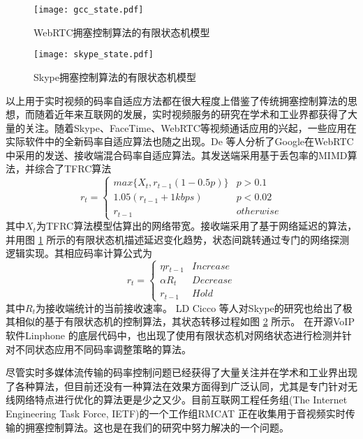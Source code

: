 \begin{figure}[htbp]
  \centering
  \texttt{[image: gcc\_state.pdf]}
  \caption{WebRTC拥塞控制算法的有限状态机模型}
  \label{fig:gcc_state}
\end{figure}

\begin{figure}[htbp]
  \centering
  \texttt{[image: skype\_state.pdf]}
  \caption{Skype拥塞控制算法的有限状态机模型}
  \label{fig:skype_state}
\end{figure}

以上用于实时视频的码率自适应方法都在很大程度上借鉴了传统拥塞控制算法的思想，而随着近年来互联网的发展，实时视频服务的研究在学术和工业界都获得了大量的关注。随着Skype、FaceTime、WebRTC等视频通话应用的兴起，一些应用在实际软件中的全新码率自适应算法也随之出现。De \cite{de2013experimental} 等人分析了Google在WebRTC中采用的发送、接收端混合码率自适应算法。其发送端采用基于丢包率的MIMD算法，并综合了TFRC算法
\begin{equation}
  r_t = \left\{ \begin{array}{ll}
    max\{X_t, r_{t-1}(1-0.5p)\} &   p > 0.1\\
    1.05(r_{t-1} + 1kbps)       &   p < 0.02\\
    r_{t-1}                     &   otherwise
  \end{array} \right.
\end{equation}
其中$X_t$为TFRC算法模型估算出的网络带宽。接收端采用了基于网络延迟的算法，并用图 \ref{fig:gcc_state} 所示的有限状态机描述延迟变化趋势，状态间跳转通过专门的网络探测逻辑实现。其相应码率计算公式为
\begin{equation}
  r_t = \left\{ \begin{array}{ll}
    \eta r_{t-1} &   Increase\\
    \alpha R_t   &   Decrease\\
    r_{t-1}      &   Hold
  \end{array} \right.
\end{equation}
其中$R_t$为接收端统计的当前接收速率。
LD Cicco \cite{cicco2010mathematical} 等人对Skype的研究也给出了极其相似的基于有限状态机的控制算法，其状态转移过程如图 \ref{fig:skype_state} 所示。
在开源VoIP软件Linphone \cite{website:linphone}的底层代码中，也出现了使用有限状态机对网络状态进行检测并针对不同状态应用不同码率调整策略的算法。

尽管实时多媒体流传输的码率控制问题已经获得了大量关注并在学术和工业界出现了各种算法，但目前还没有一种算法在效果方面得到广泛认同，尤其是专门针对无线网络特点进行优化的算法更是少之又少。目前互联网工程任务组(The Internet Engineering Task Force, IETF)的一个工作组RMCAT \cite{website:rmcat} 正在收集用于音视频实时传输的拥塞控制算法。这也是在我们的研究中努力解决的一个问题。


